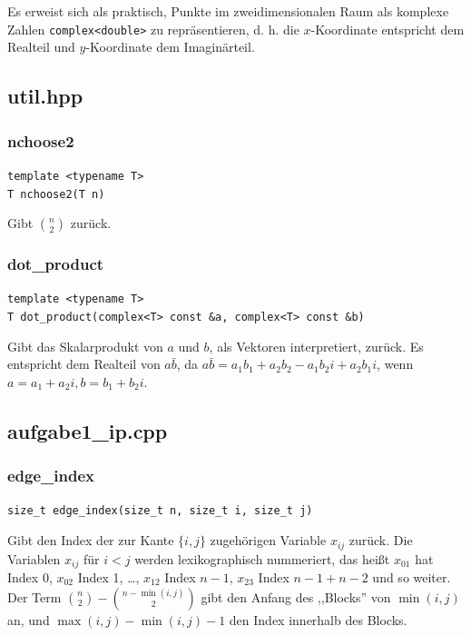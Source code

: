 \documentclass[a4paper, 10pt, ngerman]{article}
\begin{document}
Es erweist sich als praktisch, Punkte im zweidimensionalen Raum als komplexe Zahlen \verb|complex<double>| zu repräsentieren, d. h. die $x$-Koordinate entspricht dem Realteil und $y$-Koordinate dem Imaginärteil. 

\subsection{util.hpp}

\subsubsection{nchoose2}
\verb|template <typename T>| \\
\verb|T nchoose2(T n)|
\medskip

\noindent Gibt $\binom n 2$ zurück.

\subsubsection{dot\_product}
\verb|template <typename T>| \\
\verb|T dot_product(complex<T> const &a, complex<T> const &b)|
\medskip

\noindent Gibt das Skalarprodukt von $a$ und $b$, als Vektoren interpretiert, zurück. Es entspricht dem Realteil von $a \bar b$, da $a \bar b = a_1 b_1 + a_2 b_2 - a_1 b_2 i + a_2 b_1 i$, wenn $a = a_1 + a_2 i, b = b_1 + b_2 i$.

\subsection{aufgabe1\_ip.cpp}

\subsubsection{edge\_index}

\verb|size_t edge_index(size_t n, size_t i, size_t j)|
\medskip

\noindent Gibt den Index der zur Kante $\{i, j\}$ zugehörigen Variable $x_{ij}$ zurück. Die Variablen $x_{ij}$ für $i < j$ werden lexikographisch nummeriert, das heißt $x_{01}$ hat Index 0, $x_{02}$ Index 1, \dots, $x_{12}$ Index $n - 1$, $x_{23}$ Index $n - 1 + n - 2$ und so weiter. Der Term $\binom n 2 - \binom {n - \min(i, j)} 2$ gibt den Anfang des ,,Blocks'' von $\min(i, j)$ an, und $\max(i, j) - \min(i, j) - 1$ den Index innerhalb des Blocks.
\end{document}
